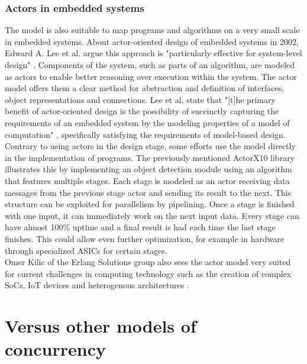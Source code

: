 \documentclass[A4]{article}
\begin{document}
\subsubsection{Actors in embedded systems}
The model is also suitable to map programs and algorithms on a very small scale in embedded systems. About actor-oriented design of embedded systems in 2002, Edward A. Lee et al. argue this approach is "particularly effective for system-level design" \cite[p.~12]{Lee03actor-orienteddesign}. Components of the system, such as parts of an algorithm, are modeled as actors to enable better reasoning over execution within the system. The actor model offers them a clear method for abstraction and definition of interfaces, object representations and connections. Lee et al. state that "[t]he primary benefit of actor-oriented design is the possibility of succinctly capturing the requirements of an embedded system by the modeling properties of a model of computation" \cite[p.~23]{Lee03actor-orienteddesign}, specifically satisfying  the requirements of model-based design. \\
Contrary to using actors in the design stage, some efforts use the model directly in the implementation of programs. The previously mentioned ActorX10 library illustrates this by implementing an object detection module using an algorithm that features multiple stages. Each stage is modeled as an actor receiving data messages from the previous stage actor and sending its result to the next. This structure can be exploited for parallelism by pipelining. Once a stage is finished with one input, it can immediately work on the next input data. Every stage can have almost 100\% uptime and a final result is had each time the last stage finishes. \cite[p.~4]{Roloff:2016:AAL:2931028.2931033} This could allow even further optimization, for example in hardware through specialized ASICs for certain stages. \\ 
Omer Kilic of the Erlang Solutions group also sees the actor model very suited for current challenges in computing technology such as the creation of complex SoCs, IoT devices and heterogenous architectures \cite[p.~5]{ErlangKilic}.

\section{Versus other models of concurrency}
\end{document}
